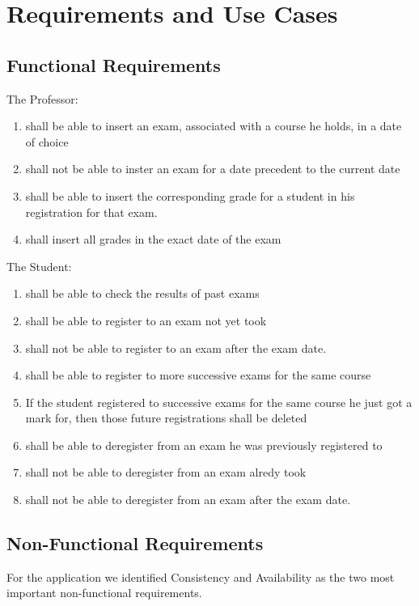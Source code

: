 \documentclass{report}
\begin{document}
\chapter*{Requirements and Use Cases}
\section*{Functional Requirements}
The Professor:
\begin{enumerate}
	\item shall be able to insert an exam, associated with a course he holds, in a date of choice
	\item shall not be able to inster an exam for a date precedent to the current date
	\item shall be able to insert the corresponding grade for a student in his registration for that exam.
	\item shall insert all grades in the exact date of the exam
\end{enumerate}
The Student:
\begin{enumerate}
	\item shall be able to check the results of past exams
	\item shall be able to register to an exam not yet took
	\item shall not be able to register to an exam after the exam date.
	\item shall be able to register to more successive exams for the same course
	\item If the student registered to successive exams for the same course he just got a mark for, then those future registrations shall be deleted
	\item shall be able to deregister from an exam he was previously registered to
	\item shall not be able to deregister from an exam alredy took
	\item shall not be able to deregister from an exam after the exam date.
\end{enumerate}
\section*{Non-Functional Requirements}
For the application we identified Consistency and Availability as the two most important non-functional requirements.
\newpage
{}
\end{document}
